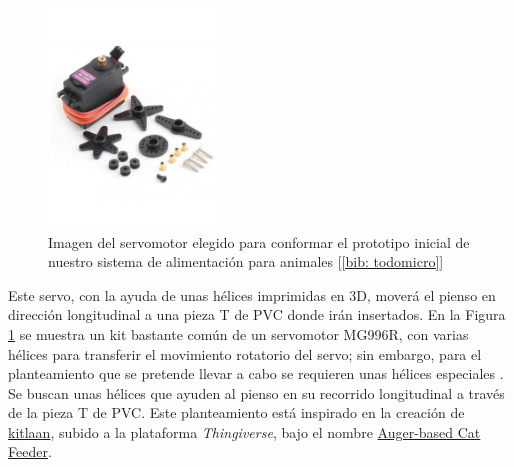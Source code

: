 \documentclass[12pt]{article}
\begin{document}
	\pagebreak
	
		\begin{figure}[h]
		\begin{center}
			\includegraphics[width=0.4\textwidth]{img/servo_mg996r.jpg}
			\caption{Imagen del servomotor elegido para conformar el prototipo inicial de nuestro sistema de alimentación para animales [\ref{bib: todomicro}]}
			\label{Imagen servomotor MG996R}
		\end{center}
	\end{figure}
	
	\noindent Este servo, con la ayuda de unas hélices imprimidas en 3D, moverá el pienso en dirección longitudinal a una pieza T de PVC donde irán insertados. En la Figura \ref{Imagen servomotor MG996R} se muestra un kit bastante común de un servomotor MG996R, con varias hélices para transferir el movimiento rotatorio del servo; sin embargo, para el planteamiento que se pretende llevar a cabo se requieren unas hélices especiales . Se buscan unas hélices que ayuden al pienso en su recorrido longitudinal a través de la pieza T de PVC. Este planteamiento está inspirado en la creación de \href{https://www.thingiverse.com/kitlaan/designs}{kitlaan}, subido a la plataforma  \textit{Thingiverse}, bajo el nombre \href{https://www.thingiverse.com/thing:27854}{Auger-based Cat Feeder}.  \\
	
	\pagebreak
	
\end{document}
